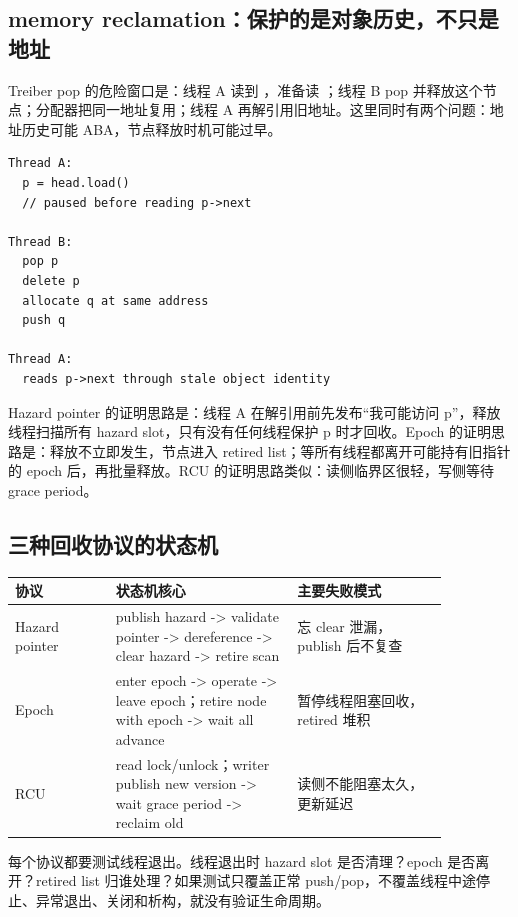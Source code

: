 \subsection{memory reclamation：保护的是对象历史，不只是地址}

Treiber pop 的危险窗口是：线程 A 读到 ，准备读 ；线程 B pop 并释放这个节点；分配器把同一地址复用；线程 A 再解引用旧地址。这里同时有两个问题：地址历史可能 ABA，节点释放时机可能过早。

\begin{lstlisting}[numbers=none,caption={Treiber pop 的危险窗口}]
Thread A:
  p = head.load()
  // paused before reading p->next

Thread B:
  pop p
  delete p
  allocate q at same address
  push q

Thread A:
  reads p->next through stale object identity
\end{lstlisting}

Hazard pointer 的证明思路是：线程 A 在解引用前先发布“我可能访问 p”，释放线程扫描所有 hazard slot，只有没有任何线程保护 p 时才回收。Epoch 的证明思路是：释放不立即发生，节点进入 retired list；等所有线程都离开可能持有旧指针的 epoch 后，再批量释放。RCU 的证明思路类似：读侧临界区很轻，写侧等待 grace period。

\subsection{三种回收协议的状态机}

\begin{center}
\begin{tabular}{p{0.20\linewidth}p{0.36\linewidth}p{0.30\linewidth}}
\toprule
协议 & 状态机核心 & 主要失败模式 \\
\midrule
Hazard pointer & publish hazard -> validate pointer -> dereference -> clear hazard -> retire scan & 忘 clear 泄漏，publish 后不复查 \\
Epoch & enter epoch -> operate -> leave epoch；retire node with epoch -> wait all advance & 暂停线程阻塞回收，retired 堆积 \\
RCU & read lock/unlock；writer publish new version -> wait grace period -> reclaim old & 读侧不能阻塞太久，更新延迟 \\
\bottomrule
\end{tabular}
\end{center}

每个协议都要测试线程退出。线程退出时 hazard slot 是否清理？epoch 是否离开？retired list 归谁处理？如果测试只覆盖正常 push/pop，不覆盖线程中途停止、异常退出、关闭和析构，就没有验证生命周期。

